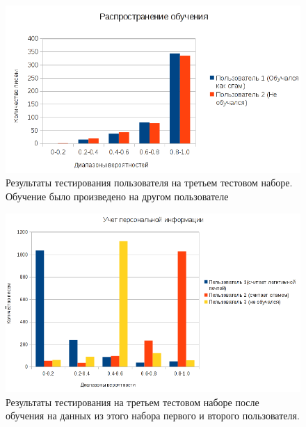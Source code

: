 \begin{figure}[h]
\begin{center}
\includegraphics[width=15cm]{img/experiment2}
\end{center}
\caption{Результаты тестирования пользователя на третьем тестовом наборе. Обучение было произведено на другом пользователе \cite{SAPC}}
\label{EXPERIMENT2}
\end{figure}

\begin{figure}[h]
\begin{center}
\includegraphics[width=15cm]{img/experiment3}
\end{center}
\caption{Результаты тестирования на третьем тестовом наборе после обучения на данных из этого набора первого и второго пользователя.}
\label{EXPERIMENT3}
\end{figure}

